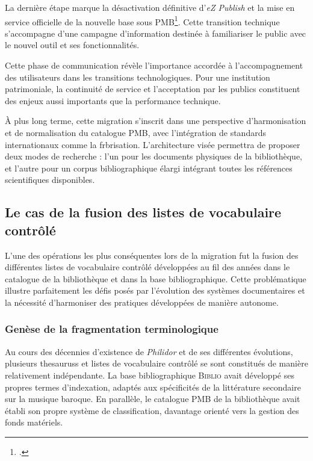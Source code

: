 La dernière étape marque la désactivation définitive d'\textit{eZ Publish} et la mise en service officielle de la nouvelle base sous PMB\footcite{marcolocascioMigrationBaseDonnees2024a}. Cette transition technique s'accompagne d'une campagne d'information destinée à familiariser le public avec le nouvel outil et ses fonctionnalités.

Cette phase de communication révèle l'importance accordée à l'accompagnement des utilisateurs dans les transitions technologiques. Pour une institution patrimoniale, la continuité de service et l'acceptation par les publics constituent des enjeux aussi importants que la performance technique.

À plus long terme, cette migration s'inscrit dans une perspective d'harmonisation et de normalisation du catalogue PMB, avec l'intégration de standards internationaux comme la \gls{frbr}isation. L'architecture visée permettra de proposer deux modes de recherche : l'un pour les documents physiques de la bibliothèque, et l'autre pour un corpus bibliographique élargi intégrant toutes les références scientifiques disponibles.

\subsection{Le cas de la fusion des listes de vocabulaire contrôlé} \label{fusion-theso}

L'une des opérations les plus conséquentes lors de la migration fut la fusion des différentes listes de vocabulaire contrôlé développées au fil des années dans le catalogue de la bibliothèque et dans la base bibliographique. Cette problématique illustre parfaitement les défis posés par l'évolution des systèmes documentaires et la nécessité d'harmoniser des pratiques développées de manière autonome.

\subsubsection{Genèse de la fragmentation terminologique}

Au cours des décennies d'existence de \textit{Philidor} et de ses différentes évolutions, plusieurs \glspl{thesaurus} et listes de vocabulaire contrôlé se sont constitués de manière relativement indépendante. La base bibliographique \textsc{Biblio} avait développé ses propres termes d'indexation, adaptés aux spécificités de la littérature secondaire sur la musique baroque. En parallèle, le catalogue PMB de la bibliothèque avait établi son propre système de classification, davantage orienté vers la gestion des fonds matériels.  


